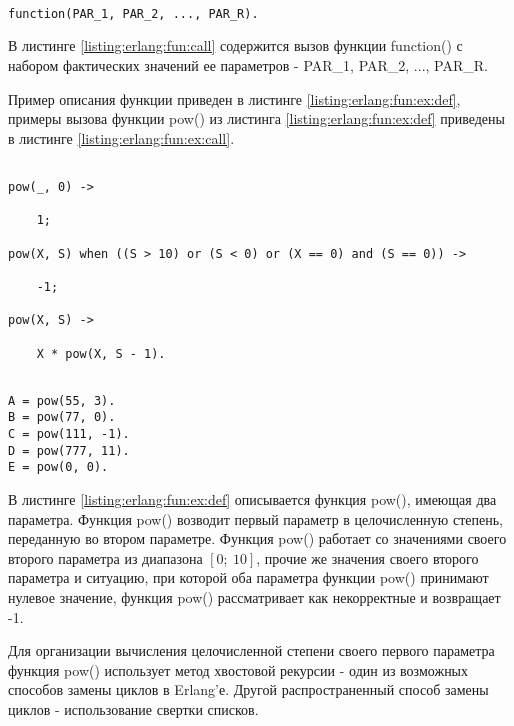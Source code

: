 \begin{lstlisting}

function(PAR_1, PAR_2, ..., PAR_R).

\end{lstlisting}
\mylistingend

В листинге \ref{listing:erlang:fun:call} содержится вызов функции function() с набором фактических значений ее параметров - PAR\_1, PAR\_2, ..., PAR\_R.

Пример описания функции приведен в листинге \ref{listing:erlang:fun:ex:def}, примеры вызова функции pow() из листинга \ref{listing:erlang:fun:ex:def} приведены в листинге \ref{listing:erlang:fun:ex:call}.

\begin{lstlisting}

pow(_, 0) ->

	1;

pow(X, S) when ((S > 10) or (S < 0) or (X == 0) and (S == 0)) ->

	-1;

pow(X, S) ->

	X * pow(X, S - 1).

\end{lstlisting}
\mylistingend

\begin{lstlisting}

A = pow(55, 3).
B = pow(77, 0).
C = pow(111, -1).
D = pow(777, 11).
E = pow(0, 0).

\end{lstlisting}
\mylistingend

В листинге \ref{listing:erlang:fun:ex:def} описывается функция pow(), имеющая два параметра. Функция pow() возводит первый параметр в целочисленную степень, переданную во втором параметре. Функция pow() работает со значениями своего второго параметра из диапазона $[0 ;~ 10]$, прочие же значения своего второго параметра и ситуацию, при которой оба параметра функции pow() принимают нулевое значение, функция pow() рассматривает как некорректные и возвращает -1.

Для организации вычисления целочисленной степени своего первого параметра функция pow() использует метод хвостовой рекурсии - один из возможных способов замены циклов в Erlang'е. Другой распространенный способ замены циклов - использование свертки списков.

